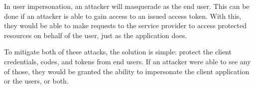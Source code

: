 In user impersonation, an attacker will masquerade as the end user. This can be done if an attacker is able to gain access to an issued access token. With this, they would be able to make requests to the service provider to access protected resources on behalf of the user, just as the application does.

To mitigate both of these attacks, the solution is simple: protect the client credentials, codes, and tokens from end users. If an attacker were able to see any of those, they would be granted the ability to impersonate the client application or the users, or both.


